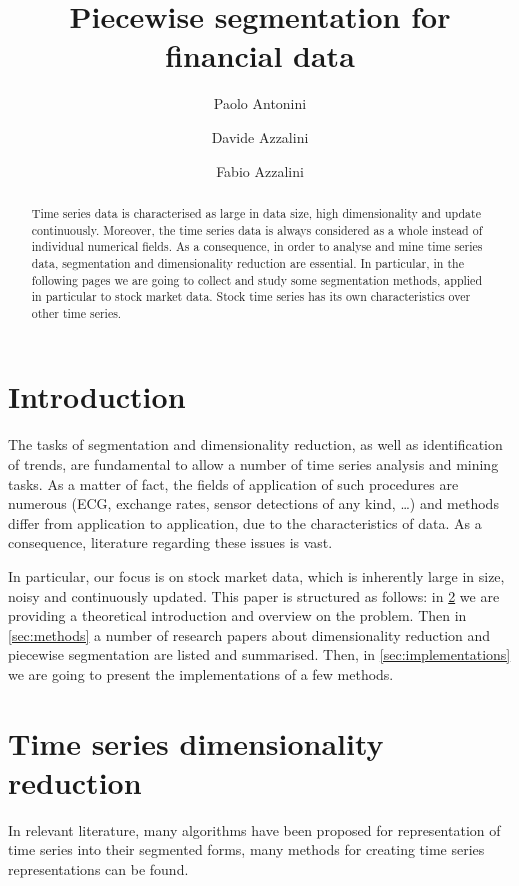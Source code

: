\documentclass[a4paper]{article}
\title{Piecewise segmentation for financial data}
\author{Paolo Antonini \and Davide Azzalini \and Fabio Azzalini}
\date{}
\begin{document}
\maketitle



\begin{abstract}
Time series data is characterised as large in data size, high dimensionality and update continuously. Moreover, the time series data is always considered as a whole instead of individual numerical fields. As a consequence, in order to analyse and mine time series data, segmentation and dimensionality reduction are essential. In particular, in the following pages we are going to collect and study some segmentation methods, applied in particular to stock market data. Stock time series has its own characteristics over other time series. 
\end{abstract}




\section{Introduction}
The tasks of segmentation and dimensionality reduction, as well as identification of trends, are fundamental to allow a number of time series analysis and mining tasks. As a matter of fact, the fields of application of such procedures are numerous (ECG, exchange rates, sensor detections of any kind, \dots) and methods differ from application to application, due to the characteristics of data. As a consequence, literature regarding these issues is vast. 

In particular, our focus is on stock market data, which is inherently large in size, noisy and continuously updated. This paper is structured as follows: in \cref{sec:theory} we are providing a theoretical introduction and overview on the problem. Then in \cref{sec:methods} a number of research papers about dimensionality reduction and piecewise segmentation are listed and summarised. Then, in \cref{sec:implementations} we are going to present the implementations of a few methods. 


\section{Time series dimensionality reduction}\label{sec:theory}

In relevant literature, many algorithms have been proposed for representation of time series into their segmented forms, many methods for creating time series representations can be found.
\end{document}
